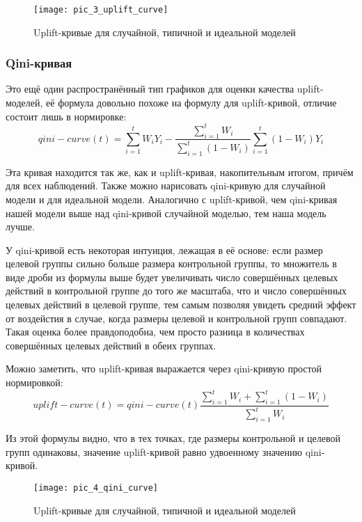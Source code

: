 \begin{figure}[ht]
\centering
\texttt{[image: pic\_3\_uplift\_curve]}
\centering
\caption{Uplift-кривые для случайной, типичной и идеальной моделей}
\label{fig:pic_3_uplift_curve}
\end{figure}


\subsubsection*{Qini-кривая}

Это ещё один распространённый тип графиков для оценки качества uplift-моделей, её формула довольно похоже на формулу для uplift-кривой, отличие состоит лишь в нормировке:
$$
    qini-curve(t) =
        \sum\limits_{i=1}^{t} W_i Y_i
        - 
        \frac{
            \sum\limits_{i=1}^{t} W_i
        }{
            \sum\limits_{i=1}^{t} (1 - W_i)
        }
        \sum\limits_{i=1}^{t} (1 - W_i) Y_i
$$

Эта кривая находится так же, как и uplift-кривая, накопительным итогом, причём для всех наблюдений. Также можно нарисовать qini-кривую для случайной модели и для идеальной модели. Аналогично с uplift-кривой, чем qini-кривая нашей модели выше над qini-кривой случайной моделью, тем наша модель лучше.

У qini-кривой есть некоторая интуиция, лежащая в её основе: если размер целевой группы сильно больше размера контрольной группы, то множитель в виде дроби из формулы выше будет увеличивать число совершённых целевых действий в контрольной группе до того же масштаба, что и число совершённых целевых действий в целевой группе, тем самым позволяя увидеть средний эффект от воздейстия в случае, когда размеры целевой и контрольной групп совпадают. Такая оценка более правдоподобна, чем просто разница в количествах совершённых целевых действий в обеих группах.

Можно заметить, что uplift-кривая выражается через qini-кривую простой нормировкой:
$$
    uplift-curve(t) = qini-curve(t) \frac{
        \sum\limits_{i=1}^{t} W_i
        +
        \sum\limits_{i=1}^{t} (1 - W_i)
    }{
        \sum\limits_{i=1}^{t} W_i
    }
$$

Из этой формулы видно, что в тех точках, где размеры контрольной и целевой групп одинаковы, значение uplift-кривой равно удвоенному значению qini-кривой. 

\begin{figure}[ht]
\centering
\texttt{[image: pic\_4\_qini\_curve]}
\centering
\caption{Uplift-кривые для случайной, типичной и идеальной моделей}
\label{fig:pic_4_qini_curve}
\end{figure}


